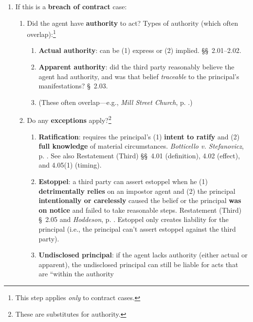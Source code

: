 \begin{enumerate}
\begin{enumerate}
    \end{enumerate}
    \item If this is a \textbf{breach of contract} case:
    \begin{enumerate}
        \item Did the agent have \textbf{authority} to act? Types of authority 
        (which often overlap):\footnote{This step applies \emph{only} to 
        contract cases.}
        \begin{enumerate}
            \item \textbf{Actual authority}: can be (1) express or (2) implied. \S\S\ 
            2.01--2.02.
            \item \textbf{Apparent authority}: did the third party reasonably believe 
            the agent had authority, and was that belief \emph{traceable} to 
            the principal's manifestations? \S\ 2.03.
            \item (These often overlap---e.g., \emph{Mill Street Church}, p.  
            \pageref{par:mill}.)
        \end{enumerate}
        \item Do any \textbf{exceptions} apply?\footnote{These are substitutes 
        for authority.}
        \begin{enumerate}
            \item \textbf{Ratification}: requires the principal's (1) 
            \textbf{intent to ratify} and (2) \textbf{full knowledge} of 
            material circumstances. \emph{Botticello v. Stefanovicz}, p.  
            \pageref{par:botticello}. See also Restatement (Third) \S\S\ 4.01 
            (definition), 4.02 (effect), and 4.05(1) (timing).
            \item \textbf{Estoppel}: a third party can assert estoppel when 
            he (1) \textbf{detrimentally relies} on an impostor agent and (2) 
            the principal \textbf{intentionally or carelessly} caused the 
            belief or the principal \textbf{was on notice} and failed to take 
            reasonable steps. Restatement (Third) \S\ 2.05 and 
            \emph{Hoddeson}, p. \pageref{par:hodd}.
            Estoppel only creates liability for the 
            principal (i.e., the principal can't assert estoppel against the 
            third party).
            \item \textbf{Undisclosed principal}: if the agent lacks 
            authority (either actual or apparent), the undisclosed principal 
            can still be liable for acts that are ``within the authority 

\end{enumerate}
\end{enumerate}
\end{enumerate}
